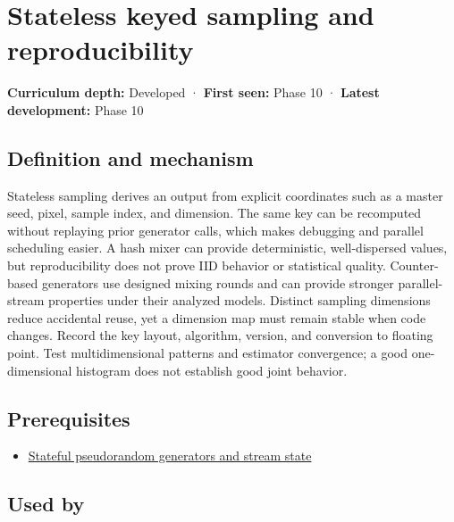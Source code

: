 \hypertarget{appendix-daaf25bfd3a0}{}\label{referencestart:appendix-daaf25bfd3a0}
\section{Stateless keyed sampling and reproducibility}\label{appendix-daaf25bfd3a0-stateless-keyed-sampling-and-reproducibility}

\textbf{Curriculum depth:} Developed · \textbf{First seen:} Phase 10 · \textbf{Latest development:} Phase 10

\begin{allmightroledefinition}

\subsection{Definition and mechanism}\label{appendix-daaf25bfd3a0-definition-and-mechanism}

Stateless sampling derives an output from explicit coordinates such as a master seed, pixel, sample index, and dimension. The same key can be recomputed without replaying prior generator calls, which makes debugging and parallel scheduling easier. A hash mixer can provide deterministic, well-dispersed values, but reproducibility does not prove IID behavior or statistical quality. Counter-based generators use designed mixing rounds and can provide stronger parallel-stream properties under their analyzed models. Distinct sampling dimensions reduce accidental reuse, yet a dimension map must remain stable when code changes. Record the key layout, algorithm, version, and conversion to floating point. Test multidimensional patterns and estimator convergence; a good one-dimensional histogram does not establish good joint behavior.

\end{allmightroledefinition}

\subsection{Prerequisites}\label{appendix-daaf25bfd3a0-prerequisites}

\begin{itemize}
\tightlist
\item
  \hyperref[appendix-e0f7c7e08f3a]{Stateful pseudorandom generators and stream state}
\end{itemize}

\subsection{Used by}\label{appendix-daaf25bfd3a0-used-by}

